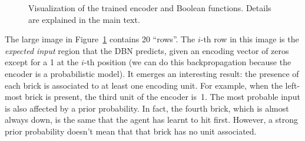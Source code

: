 \begin{figure}
	\caption{Visualization of the trained encoder and Boolean functions. Details
	are explained in the main text.}
	\label{fig:breakout-model-all}
\end{figure}
The large image in Figure~\ref{fig:breakout-model-all} contains 20 ``rows''.
The $i$-th row in this image is the \emph{expected input} region that the DBN
predicts, given an encoding vector of zeros except for a 1 at the $i$-th
position (we can do this backpropagation because the encoder is a
probabilistic model). It emerges an interesting result: the presence of each
brick is associated to at least one encoding unit. For example, when the
left-most brick is present, the third unit of the encoder is~1. The most
probable input is also affected by a prior probability. In fact, the fourth
brick, which is almost always down, is the same that the agent has learnt to
hit first. However, a strong prior probability doesn't mean that that brick
has no unit associated.

